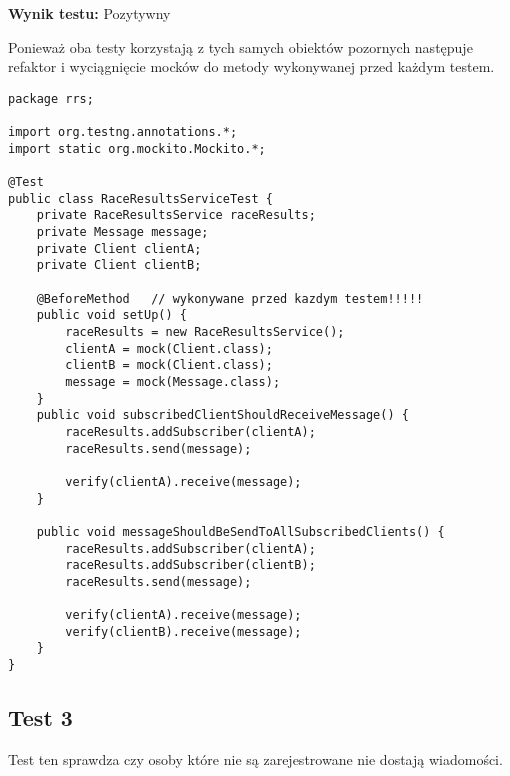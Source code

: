 \documentclass[a4paper,12pt,twoside]{article}
\begin{document}
\noindent
\textbf{Wynik testu: }{\color{green} Pozytywny}

Ponieważ oba testy korzystają z tych samych obiektów pozornych następuje refaktor i wyciągnięcie
mocków do metody wykonywanej przed każdym testem.

\begin{lstlisting}
package rrs;

import org.testng.annotations.*;
import static org.mockito.Mockito.*;

@Test
public class RaceResultsServiceTest {
    private RaceResultsService raceResults;
    private Message message;
    private Client clientA;
    private Client clientB;
    
    @BeforeMethod	// wykonywane przed kazdym testem!!!!!
    public void setUp() {
        raceResults = new RaceResultsService();
        clientA = mock(Client.class);
        clientB = mock(Client.class);
        message = mock(Message.class);
    }
    public void subscribedClientShouldReceiveMessage() {
        raceResults.addSubscriber(clientA);
        raceResults.send(message);
        
        verify(clientA).receive(message);
    }
    
    public void messageShouldBeSendToAllSubscribedClients() {
        raceResults.addSubscriber(clientA);
        raceResults.addSubscriber(clientB);
        raceResults.send(message);
        
        verify(clientA).receive(message);
        verify(clientB).receive(message);
    }
}
\end{lstlisting}

\subsection{Test 3}

Test ten sprawdza czy osoby które nie są zarejestrowane nie dostają wiadomości.
\end{document}
